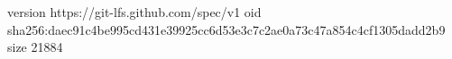 version https://git-lfs.github.com/spec/v1
oid sha256:daec91c4be995cd431e39925cc6d53e3c7c2ae0a73c47a854c4cf1305dadd2b9
size 21884
